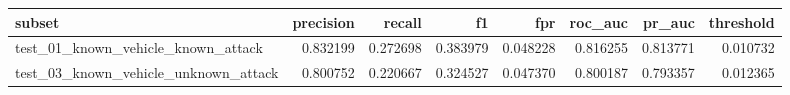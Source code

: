 \begin{tabular}{lrrrrrrr}
\toprule
subset & precision & recall & f1 & fpr & roc_auc & pr_auc & threshold \\
\midrule
test_01_known_vehicle_known_attack & 0.832199 & 0.272698 & 0.383979 & 0.048228 & 0.816255 & 0.813771 & 0.010732 \\
test_03_known_vehicle_unknown_attack & 0.800752 & 0.220667 & 0.324527 & 0.047370 & 0.800187 & 0.793357 & 0.012365 \\
\bottomrule
\end{tabular}
